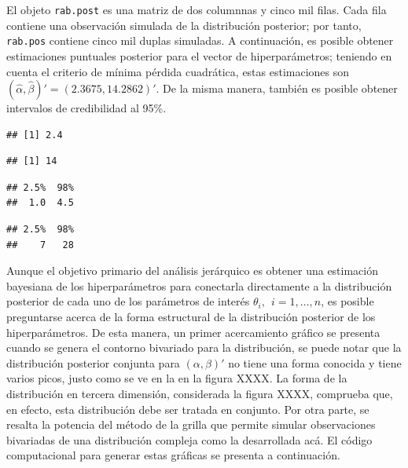 El objeto \verb'rab.post' es una matriz de dos columnnas y cinco mil filas. Cada fila contiene una observación simulada de la distribución posterior; por tanto, \verb'rab.pos' contiene cinco mil duplas simuladas. A continuación, es posible obtener estimaciones puntuales posterior para el vector de hiperparámetros; teniendo en cuenta el criterio de mínima pérdida cuadrática, estas estimaciones son $(\hat{\alpha},\hat{\beta})'=(2.3675, 14.2862)'$. De la misma manera, también es posible obtener intervalos de credibilidad al 95\%.

\begin{knitrout}
\color{fgcolor}\begin{kframe}
\begin{alltt}
\end{alltt}
\begin{verbatim}
## [1] 2.4
\end{verbatim}
\begin{alltt}
\end{alltt}
\begin{verbatim}
## [1] 14
\end{verbatim}
\begin{alltt}
 \hlstd{(}\hlstd{,}\hlstd{))}
\end{alltt}
\begin{verbatim}
## 2.5%  98% 
##  1.0  4.5
\end{verbatim}
\begin{alltt}
 \hlstd{(}\hlstd{,}\hlstd{))}
\end{alltt}
\begin{verbatim}
## 2.5%  98% 
##    7   28
\end{verbatim}
\end{kframe}
\end{knitrout}
Aunque el objetivo primario del análisis jerárquico es obtener una estimación bayesiana de los hiperparámetros para conectarla directamente a la distribución posterior de cada uno de los parámetros de interés $\theta_i, \ \ i=1, \ldots, n$, es posible preguntarse acerca de la forma estructural de la distribución posterior de los hiperparámetros. De esta manera, un primer acercamiento gráfico se presenta cuando se genera el contorno bivariado para la distribución, se puede notar que la distribución posterior conjunta para $(\alpha, \beta)'$ no tiene una forma conocida y tiene varios picos, justo como se ve en la en la figura XXXX. La forma de la distribución en tercera dimensión, considerada la figura XXXX, comprueba que, en efecto, esta distribución debe ser tratada en conjunto. Por otra parte, se resalta la potencia del método de la grilla que permite simular observaciones bivariadas de una distribución compleja como la desarrollada acá. El código computacional para generar estas gráficas se presenta a continuación.
